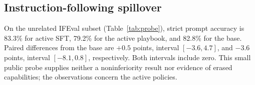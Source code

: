 \documentclass[10pt,twocolumn,letterpaper]{article}
\newcommand{\claim}[2]{#2}
\begin{document}
\subsection{Instruction-following spillover}
\claim{C71}{On the unrelated IFEval subset (Table~\ref{tab:probe}), strict prompt accuracy is 83.3\% for active SFT, 79.2\% for the active playbook, and 82.8\% for the base. Paired differences from the base are $+0.5$ points, interval $[-3.6,4.7]$, and $-3.6$ points, interval $[-8.1,0.8]$, respectively. Both intervals include zero. This small public probe supplies neither a noninferiority result nor evidence of erased capabilities; the observations concern the active policies.}

\begin{table}[t]
\centering\small
\setlength{\tabcolsep}{3pt}

\caption{\claim{T01}{Endpoint scores (percent). Playbook, SFT, and SFT-control rows pool three seeds; other rows use one policy. Each policy has 288 episodes. $S\mid U$ conditions on validity; all-rule success requires validity. The last two rows supply privileged rubric instructions, with the compact rendering added as an exploratory follow-up.}}
\label{tab:endpoint}
\end{table}

\begin{table}[t]
\centering\small
\setlength{\tabcolsep}{4pt}

\caption{\claim{T02}{Active-policy instruction probe (percent). Every policy answers the same 128 IFEval prompts, containing 206 instruction checks, once. Adapter and playbook rows pool three seeds. Strict prompt accuracy requires all instructions in a prompt; instruction accuracy pools individual checks.}}
\label{tab:probe}
\end{table}
\end{document}
